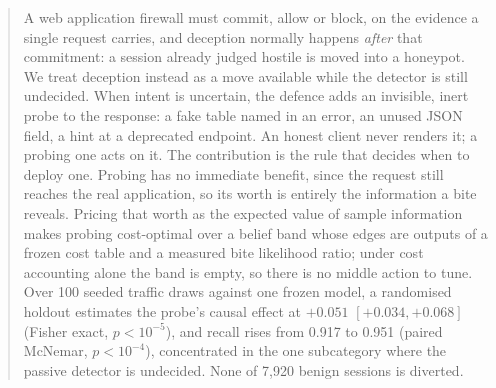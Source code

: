 
\begin{abstract}
A web application firewall must commit, allow or block, on the evidence a single
request carries, and deception normally happens \emph{after} that commitment: a
session already judged hostile is moved into a honeypot. We treat deception instead
as a move available while the detector is still undecided. When intent is uncertain,
the defence adds an invisible, inert probe to the response: a fake table named in an
error, an unused JSON field, a hint at a deprecated endpoint. An honest client never
renders it; a probing one acts on it. The contribution is the rule that decides when
to deploy one. Probing has no immediate benefit, since the request still reaches the
real application, so its worth is entirely the information a bite reveals. Pricing
that worth as the expected value of sample information makes probing cost-optimal
over a belief band whose edges are outputs of a frozen cost table and a measured
bite likelihood ratio; under cost accounting alone the band is empty, so there is no
middle action to tune. Over 100 seeded traffic draws against one frozen model, a
randomised holdout estimates the probe's causal effect at $+0.051$
$[+0.034, +0.068]$ (Fisher exact, $p < 10^{-5}$), and recall rises from 0.917 to
0.951 (paired McNemar, $p < 10^{-4}$), concentrated in the one subcategory where the
passive detector is undecided. None of 7{,}920 benign sessions is diverted.

\end{abstract}
